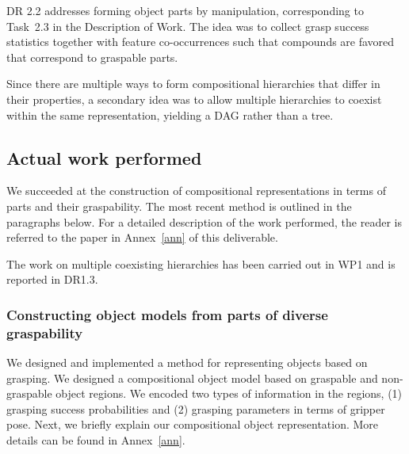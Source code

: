 \documentclass[a4paper,11pt,pdf]{pacmanreport}
\begin{document}

DR 2.2 addresses forming object parts by manipulation, corresponding
to Task~2.3 in the Description of Work.  The idea was to collect grasp
success statistics together with feature co-occurrences such that
compounds are favored that correspond to graspable parts.

Since there are multiple ways to form compositional hierarchies that
differ in their properties, a secondary idea was to allow multiple
hierarchies to coexist within the same representation, yielding a DAG
rather than a tree.


\subsection{Actual work performed}


We succeeded at the construction of compositional representations in
terms of parts and their graspability.  The most recent method is
outlined in the paragraphs below.  For a detailed description of the
work performed, the reader is referred to the paper in Annex~\ref{ann}
of this deliverable.


The work on multiple coexisting hierarchies has been carried out in WP1 and is reported in DR1.3.

\subsubsection{Constructing object models from parts of diverse graspability}

We designed and implemented a method for representing objects based on
grasping. We designed a compositional object model based on graspable
and non-graspable object regions. We encoded two types of information
in the regions, (1) grasping success probabilities and (2) grasping
parameters in terms of gripper pose. Next, we brief\-ly explain our
compositional object representation. More details can be found in
Annex~\ref{ann}.
\end{document}
